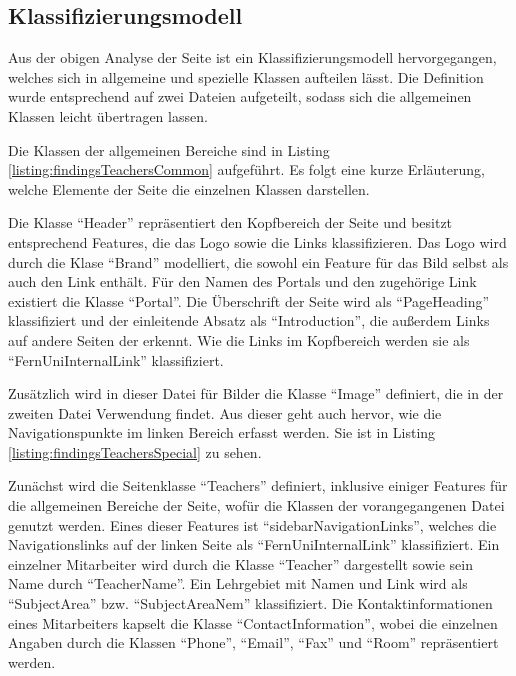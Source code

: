 \subsection{Klassifizierungsmodell}
    Aus der obigen Analyse der Seite ist ein Klassifizierungsmodell hervorgegangen,
    welches sich in allgemeine und spezielle Klassen aufteilen lässt.
    Die Definition wurde entsprechend auf zwei Dateien aufgeteilt,
    sodass sich die allgemeinen Klassen leicht übertragen lassen.

    Die Klassen der allgemeinen Bereiche sind in Listing
    \ref{listing:findingsTeachersCommon} aufgeführt.
    Es folgt eine kurze Erläuterung,
    welche Elemente der Seite die einzelnen Klassen darstellen.

    

    Die Klasse "`Header"' repräsentiert den Kopfbereich der Seite
    und besitzt entsprechend Features,
    die das Logo sowie die Links klassifizieren.
    Das Logo wird durch die Klase "`Brand"' modelliert,
    die sowohl ein Feature für das Bild selbst als auch den Link enthält.
    Für den Namen des Portals und den zugehörige Link existiert die Klasse "`Portal"'.
    Die Überschrift der Seite wird als "`PageHeading"' klassifiziert und
    der einleitende Absatz als "`Introduction"', die außerdem Links auf andere
    Seiten der {\fernUni} erkennt.
    Wie die Links im Kopfbereich werden sie als "`FernUniInternalLink"' klassifiziert.

    Zusätzlich wird in dieser Datei für Bilder die Klasse "`Image"' definiert,
    die in der zweiten Datei Verwendung findet.
    Aus dieser geht auch hervor, wie die Navigationspunkte im linken Bereich erfasst werden.
    Sie ist in Listing \ref{listing:findingsTeachersSpecial} zu sehen.

    

    Zunächst wird die Seitenklasse "`Teachers"' definiert,
    inklusive einiger Features für die allgemeinen Bereiche der Seite,
    wofür die Klassen der vorangegangenen Datei genutzt werden.
    Eines dieser Features ist "`sidebarNavigationLinks"',
    welches die Navigationslinks auf der linken Seite als "`FernUniInternalLink"'
    klassifiziert.
    Ein einzelner Mitarbeiter wird durch die Klasse "`Teacher"' dargestellt
    sowie sein Name durch "`TeacherName"'.
    Ein Lehrgebiet mit Namen und Link wird als "`SubjectArea"' bzw. "`SubjectAreaNem"' klassifiziert.
    Die Kontaktinformationen eines Mitarbeiters kapselt die Klasse "`ContactInformation"',
    wobei die einzelnen Angaben durch die Klassen "`Phone"', "`Email"', "`Fax"' und "`Room"'
    repräsentiert werden.

